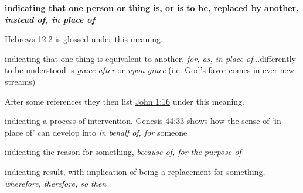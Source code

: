 				\begin{compactdesc}
					\item[BDAG 76b] \textbf{}
						\begin{compactitem}
							\item[1] \textbf{indicating that one person or thing is, or is to be, replaced by another, \textit{instead of, in place of}}
								\begin{compactitem}
									\item \hyperref[HEBREWS-12-2]{Hebrews 12:2} is glossed under this meaning.
								\end{compactitem}
							\item[2] indicating that one thing is equivalent to another, \textit{for, as, in place of}...differently to be understood is  \textit{grace after} or \textit{upon grace} (i.e. God's favor comes in ever new streams)
								\begin{compactitem}
									\item After some references they then list \hyperref[JOHN-1-16]{John 1:16} under this meaning.
								\end{compactitem}
							\item[3] indicating a process of intervention. Genesis 44:33 shows how the sense of `in place of' can develop into \textit{in behalf of, for} someone
							\item[4] indicating the reason for something, \textit{because of, for the purpose of}
							\item[5] indicating result, with implication of being a replacement for something, \textit{wherefore, therefore, so then}
						\end{compactitem}
				\end{compactdesc}
				
		
	

